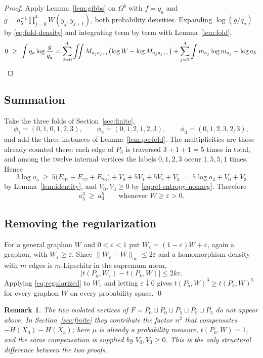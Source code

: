 \documentclass[11pt]{article}
\newtheorem{remark}[theorem]{Remark}
\begin{document}
\begin{proof}
Apply Lemma~\ref{lem:gibbs} on $\Omega^6$ with $f=q_a$ and
$g=a_5^{-1}\prod_{j=0}^4W(y_j,y_{j+1})$, both probability densities.  Expanding
$\log(g/q_a)$ by \eqref{eq:fold-density} and integrating term by term with
Lemma~\ref{lem:fold},
\[
 0\ \geq\ \int q_a\log\frac{g}{q_a}
 =\sum_{j=0}^{4}\iint M_{a_ja_{j+1}}\bigl(\log W-\log M_{a_ja_{j+1}}\bigr)
 +\sum_{j=1}^{4}\int m_{a_j}\log m_{a_j}
 -\log a_5 . \qedhere
\]
\end{proof}

\subsection{Summation}

Take the three folds of Section~\ref{sec:finite},
\[
 \phi_1=(0,1,0,1,2,3),\qquad
 \phi_2=(0,1,2,1,2,3),\qquad
 \phi_3=(0,1,2,3,2,3),
\]
and add the three instances of Lemma~\ref{lem:perfold}.  The multiplicities are
those already counted there: each edge of $P_3$ is traversed $3+1+1=5$ times in
total, and among the twelve internal vertices the labels $0,1,2,3$ occur
$1,5,5,1$ times.  Hence
\[
 3\log a_5
 \ \geq\ 5\bigl(E_{01}+E_{12}+E_{23}\bigr)+V_0+5V_1+5V_2+V_3
 \ =\ 5\log a_3+V_0+V_3
\]
by Lemma~\ref{lem:identity}, and $V_0,V_3\geq0$ by
\eqref{eq:rel-entropy-nonneg}.  Therefore
\begin{equation}
 a_5^3\ \geq\ a_3^5
 \qquad\text{whenever }W\geq\varepsilon>0 .
 \label{eq:regularized}
\end{equation}

\subsection{Removing the regularization}
\label{sec:limit}

For a general graphon $W$ and $0<\varepsilon<1$ put
$W_\varepsilon=(1-\varepsilon)W+\varepsilon$, again a graphon, with
$W_\varepsilon\geq\varepsilon$.  Since
$\lVert W_\varepsilon-W\rVert_\infty\leq2\varepsilon$ and a homomorphism
density with $m$ edges is $m$-Lipschitz in the supremum norm,
\[
 |t(P_k,W_\varepsilon)-t(P_k,W)|\leq2k\varepsilon .
\]
Applying \eqref{eq:regularized} to $W_\varepsilon$ and letting
$\varepsilon\downarrow0$ gives $t(P_5,W)^3\geq t(P_3,W)^5$ for every graphon
$W$ on every probability space.  \qed

\begin{remark}
The two isolated vertices of $F=P_0\sqcup P_0\sqcup P_5\sqcup P_5\sqcup P_5$ do
not appear above.  In Section~\ref{sec:finite} they contribute the factor $n^2$
that compensates $-H(X_0)-H(X_3)$; here $\mu$ is already a probability measure,
$t(P_0,W)=1$, and the same compensation is supplied by $V_0,V_3\geq0$.  This is
the only structural difference between the two proofs.
\end{remark}
\end{document}
